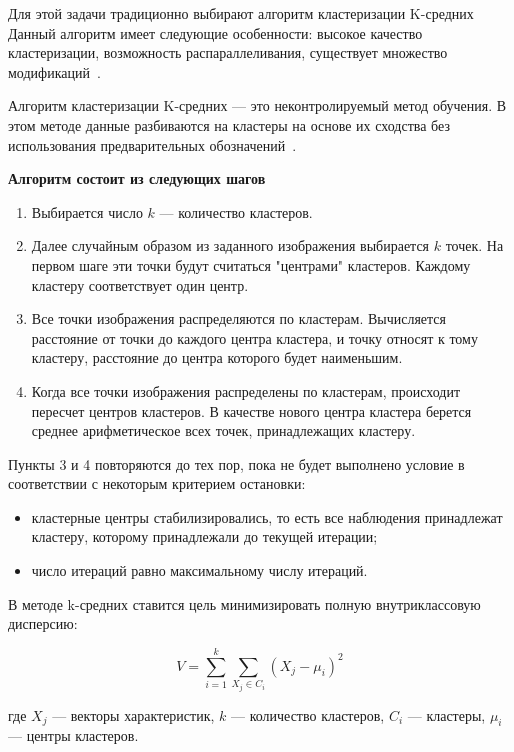 Для этой задачи традиционно выбирают алгоритм кластеризации K-средних~\cite{alg, web}
Данный алгоритм имеет следующие особенности: высокое качество кластеризации, возможность распараллеливания, существует множество модификаций~\cite{clustering}. 

Алгоритм кластеризации K-средних --- это неконтролируемый метод обучения.
В этом методе данные разбиваются на кластеры на основе их сходства без использования предварительных обозначений~\cite{alg}.


\textbf{Алгоритм состоит из следующих шагов~\cite{defcluctering}}

\begin{enumerate}
	\item Выбирается число \( k \) --- количество кластеров.
	\item Далее случайным образом из заданного изображения выбирается \( k \) точек. На первом шаге эти точки будут считаться "центрами" кластеров. Каждому кластеру соответствует один центр.
	\item Все точки изображения распределяются по кластерам. Вычисляется расстояние от точки до каждого центра кластера, и точку относят к тому кластеру, расстояние до центра которого будет наименьшим.
	\item Когда все точки изображения распределены по кластерам, происходит пересчет центров кластеров. В качестве нового центра кластера берется среднее арифметическое всех точек, принадлежащих кластеру.
\end{enumerate}

Пункты 3 и 4 повторяются до тех пор, пока не будет выполнено условие в соответствии с некоторым критерием остановки:
\begin{itemize}
	\item кластерные центры стабилизировались, то есть все наблюдения принадлежат кластеру, которому принадлежали до текущей итерации;
	\item число итераций равно максимальному числу итераций.
\end{itemize}

В методе k-средних ставится цель минимизировать полную внутриклассовую дисперсию:

\begin{equation}
	V = \sum_{i=1}^{k} \sum_{X_j \in C_i} (X_j - \mu_i)^2
	\label{eq:disperion}
\end{equation}

где \(X_j\) --- векторы характеристик, \(k\) --- количество кластеров, \(C_i\) --- кластеры, \(\mu_i\) --- центры кластеров.


